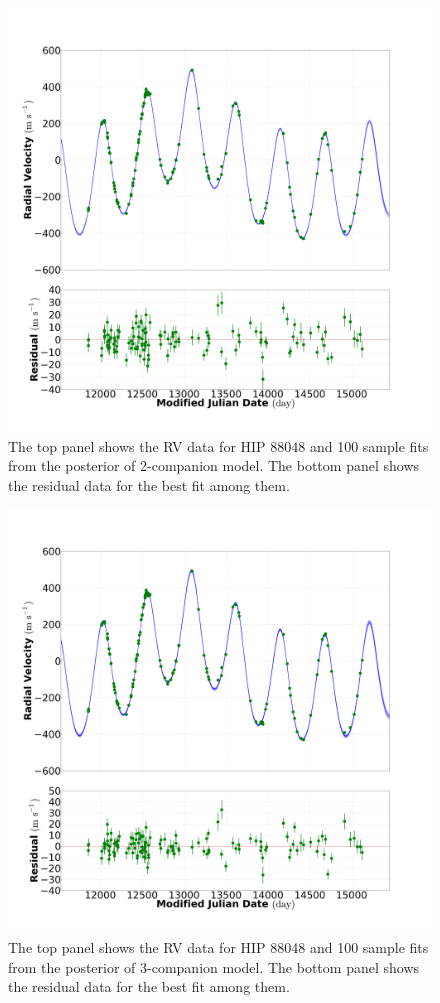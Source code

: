 \documentclass[letterpaper, preprint]{aastex}
\begin{document}
\begin{figure}
 \includegraphics[width=0.99\linewidth]{fit_res_282_mod_2_20130930.png}
 \caption{The top panel shows the RV data for HIP 88048 and 100 sample fits from the posterior of 2-companion model. The bottom panel shows the residual data for the best fit among them.}
 \label{fig:282-2-fit}
\end{figure}

\begin{figure}
 \includegraphics[width=0.99\linewidth]{fit_res_282_mod_3_20130930.png}
 \caption{The top panel shows the RV data for HIP 88048 and 100 sample fits from the posterior of 3-companion model. The bottom panel shows the residual data for the best fit among them.}
 \label{fig:282-3-fit}
\end{figure}
\end{document}

